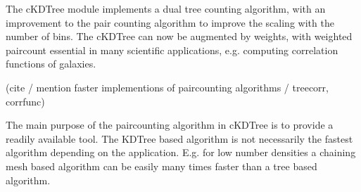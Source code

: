 The cKDTree module implements a dual tree counting algorithm\cite{Moore2000ar},
with an improvement to the pair counting algorithm to improve the scaling
with the number of bins. The cKDTree can now be augmented by weights, with 
weighted paircount essential in many scientific applications, e.g. computing 
correlation functions of galaxies\cite{0004-637X-750-1-38}.

(cite / mention faster implementions of paircounting algorithms / treecorr, corrfunc)

The main purpose of the paircounting algorithm in cKDTree is to provide a readily
available tool. The KDTree based algorithm is not necessarily the fastest algorithm
depending on the application. E.g. for low number densities a chaining mesh based algorithm
can be easily many times faster than a tree based algorithm.

